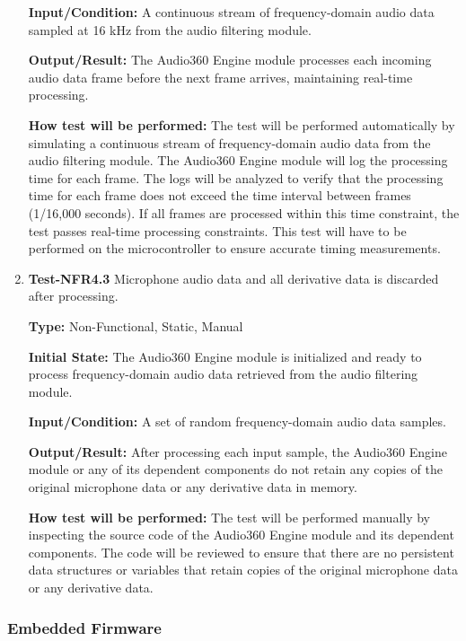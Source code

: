 \documentclass[12pt, titlepage]{article}
\begin{document}
\begin{enumerate}
\textbf{Input/Condition:}
A continuous stream of frequency-domain audio data sampled at 16 kHz from
the audio filtering module.

\textbf{Output/Result:}
The Audio360 Engine module processes each incoming audio data frame
before the next frame arrives, maintaining real-time processing.

\textbf{How test will be performed:}
The test will be performed automatically by simulating a continuous stream
of frequency-domain audio data from the audio filtering module. The
Audio360 Engine module will log the processing time for each frame. The
logs will be analyzed to verify that the processing time for each frame
does not exceed the time interval between frames (1/16,000 seconds). If
all frames are processed within this time constraint, the test passes real-time
processing constraints. This test will have to be performed on the 
microcontroller to ensure accurate timing measurements.

\item{\textbf{Test-NFR4.3} Microphone audio data and all derivative data is discarded
 after processing.\\}

\textbf{Type:} Non-Functional, Static, Manual

\textbf{Initial State:}
The Audio360 Engine module is initialized and ready to process frequency-domain
audio data retrieved from the audio filtering module.

\textbf{Input/Condition:}
A set of random frequency-domain audio data samples.

\textbf{Output/Result:}
After processing each input sample, the Audio360 Engine module or any of its
dependent components do not retain any copies of the original microphone data
or any derivative data in memory.

\textbf{How test will be performed:}
The test will be performed manually by inspecting the source code of the
Audio360 Engine module and its dependent components. The code will be reviewed
to ensure that there are no persistent data structures or variables that
retain copies of the original microphone data or any derivative data.

\end{enumerate}

\subsubsection{Embedded Firmware}
\end{document}
